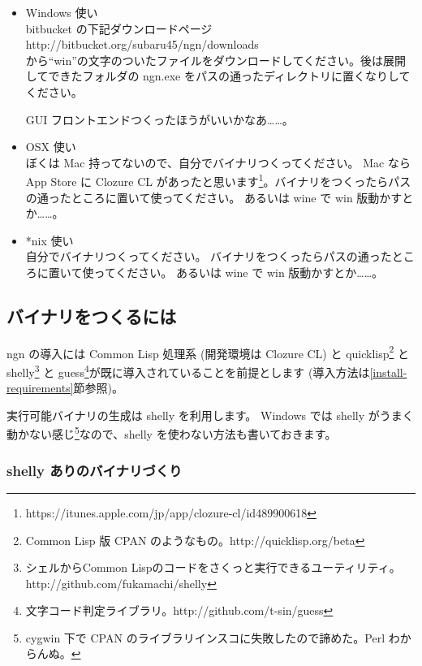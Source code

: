 \documentclass[a4j]{jsarticle}
\begin{document}
\begin{itemize}
\item Windows 使い\\
  bitbucket の下記ダウンロードページ \\
  http://bitbucket.org/subaru45/ngn/downloads \\
から``win''の文字のついたファイルをダウンロードしてください。後は展開してできたフォルダの ngn.exe をパスの通ったディレクトリに置くなりしてください。

GUI フロントエンドつくったほうがいいかなあ……。\\

\item OSX 使い\\
  ぼくは Mac 持ってないので、自分でバイナリつくってください。
  Mac なら App Store に Clozure CL があったと思います\footnote{https://itunes.apple.com/jp/app/clozure-cl/id489900618}。バイナリをつくったらパスの通ったところに置いて使ってください。
  あるいは wine で win 版動かすとか……。\\

\item *nix 使い\\
  自分でバイナリつくってください。
  バイナリをつくったらパスの通ったところに置いて使ってください。
  あるいは wine で win 版動かすとか……。\\

\end{itemize}


\subsection{バイナリをつくるには}
ngn の導入には Common Lisp 処理系 (開発環境は Clozure CL) と quicklisp\footnote{Common Lisp 版 CPAN のようなもの。http://quicklisp.org/beta} と shelly\footnote{シェルからCommon Lispのコードをさくっと実行できるユーティリティ。http://github.com/fukamachi/shelly} と guess\footnote{文字コード判定ライブラリ。http://github.com/t-sin/guess}が既に導入されていることを前提とします (導入方法は\ref{install-requirements}節参照)。

実行可能バイナリの生成は shelly を利用します。
Windows では shelly がうまく動かない感じ\footnote{cygwin 下で CPAN のライブラリインスコに失敗したので諦めた。Perl わからんぬ。}なので、shelly を使わない方法も書いておきます。


\subsubsection{shelly ありのバイナリづくり}
\end{document}
